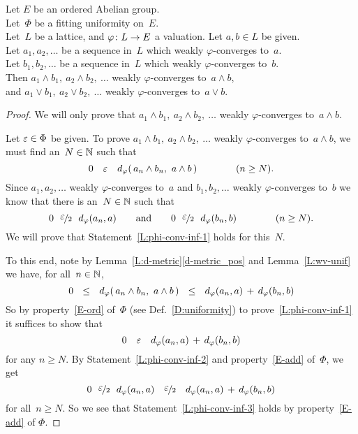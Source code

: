 \documentclass[main.tex]{subfiles}
\begin{document}
%
%
\begin{lem}
\label{L:phi-conv-inf}
Let $E$ be an ordered Abelian group.\\
Let~$\Phi$ be a fitting uniformity on~$E$.\\
Let~$L$ be a lattice, and $\varphi\colon L\rightarrow E$ a valuation.
Let $a,b\in L$ be given.\\
Let $a_1,a_2,\dotsc$ 
be a sequence in~$L$ which weakly $\varphi$-converges to~$a$.\\
Let $b_1,b_2,\dotsc$
be a sequence in~$L$ which weakly $\varphi$-converges to~$b$.\\
Then $a_1\wedge b_1,\ a_2\wedge b_2,\ \dotsc$
weakly $\varphi$-converges to~$a\wedge b$,\\
and $a_1\vee b_1,\ a_2\vee b_2,\ \dotsc$
weakly $\varphi$-converges to~$a\vee b$.
\end{lem}
\begin{proof}
We will only prove that $a_1\wedge b_1,\ a_2\wedge b_2,\ \dotsc$
weakly $\varphi$-converges to~$a\wedge b$.

Let $\varepsilon \in \Phi$ be given.
To prove  $a_1\wedge b_1,\ a_2\wedge b_2,\ \dotsc$
weakly $\varphi$-converges to~$a\wedge b$,
we must find an~$N\in\mathbb{N}$
 such that 
\begin{equation}
\label{L:phi-conv-inf-1}
0\quad \varepsilon\quad d_{\smash{\varphi}}(\,a_n\wedge b_n,\ a\wedge b\,)
\qquad\qquad(n\geq N).
\end{equation}
Since $a_1,a_2, \dotsc$ weakly $\varphi$-converges to~$a$
and $b_1,b_2,\dotsc$ weakly $\varphi$-converges to~$b$
we know
that there is an~$N\in\mathbb{N}$ such that 
\begin{equation}
\label{L:phi-conv-inf-2}
0\ \ \smash{\nicefrac{\textstyle{\varepsilon}}{2}}\ \ d_{\smash{\varphi}}(a_n, a)
\qquad\text{and}\qquad
0\ \ \smash{\nicefrac{\textstyle{\varepsilon}}{2}}\ \ d_{\smash{\varphi}}(b_n,b)
\qquad\qquad(n\geq N).
\end{equation}
We will prove that Statement~\eqref{L:phi-conv-inf-1}
holds for this~$N$.

To this end, note by Lemma~\ref{L:d-metric}\ref{d-metric_pos}
and Lemma~\ref{L:wv-unif} we have, for all~$n\in \mathbb{N}$,
\begin{equation*}
0 \ \ \leq\ \ 
\ld\varphi(\,a_n\wedge b_n,\ a\wedge b\,)
\ \ \leq\ \ 
\ld\varphi(a_n, a) \,+\,
\ld\varphi(b_n, b)
\end{equation*}
So by property~\ref{E-ord} of~$\Phi$
(see Def.~\ref{D:uniformity})
to prove~\eqref{L:phi-conv-inf-1}
it suffices to show  that
\begin{equation}
\label{L:phi-conv-inf-3}
0\quad\varepsilon\quad
d_{\smash{\varphi}}(a_n, a) \,+\,
d_{\smash{\varphi}}(b_n, b)
\end{equation}
for any $n\geq N$.
By Statement~\eqref{L:phi-conv-inf-2} 
and property~\ref{E-add} of~$\Phi$, we get
\begin{equation*}
0 
\ \ \dt\ve  \ \ 
\ld\varphi(a_n, a)
\quad \dt\ve \quad
\ld\varphi(a_n, a) \,+\,
\ld\varphi(b_n, b)
\end{equation*}
for all~$n\geq N$. 
So we see that Statement~\eqref{L:phi-conv-inf-3} 
holds by property~\ref{E-add} of $\Phi$.
\end{proof}
\end{document}
